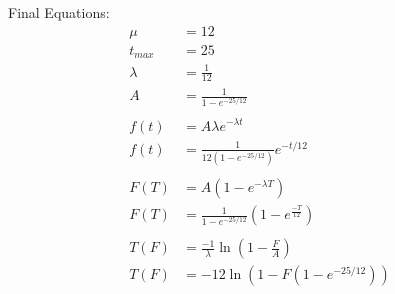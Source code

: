 \documentclass[12pt]{article}
\begin{document}
Final Equations:
\begin{align*}
	\mu &= 12 \\
	t_{max} &= 25 \\
	\lambda &= \frac{1}{12} \\
	A &= \frac{1}{1 - e^{-25/12}} \\
	\\
	f(t) &= A \lambda e^{-\lambda t} \\
	f(t) &= \frac{1}{12 (1 - e^{-25/12})} e^{-t/12} \\
	\\
	F(T) &= A\left(1 - e^{-\lambda T}\right) \\
	F(T) &= \frac{1}{1 - e^{-25/12}}\left(1 - e^{\frac{-T}{12}}\right) \\
	\\
	T(F) &= \frac{-1}{\lambda}\ln\left(1 - \frac{F}{A}\right) \\
	T(F) &= -12 \ln\left(1 - F(1 - e^{-25/12})\right) \\
\end{align*}
\end{document}
